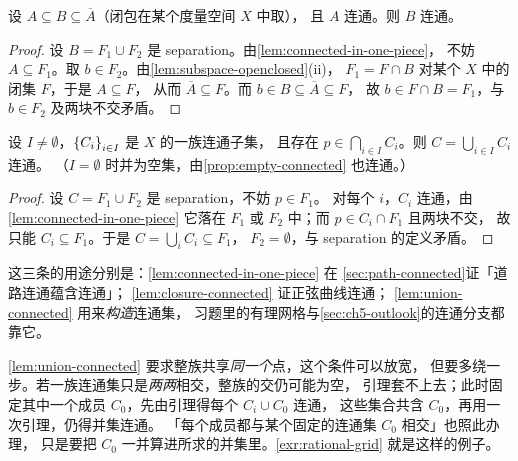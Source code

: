 \begin{lemma}[闭包连通]
  \label{lem:closure-connected}
  设 \(A \subseteq B \subseteq \overline{A}\)（闭包在某个度量空间 \(X\) 中取），
  且 \(A\) 连通。则 \(B\) 连通。
\end{lemma}

\begin{proof}
  设 \(B = F_{1} \cup F_{2}\) 是 separation。由\cref{lem:connected-in-one-piece}，
  不妨 \(A \subseteq F_{1}\)。取 \(b \in F_{2}\)。由\cref{lem:subspace-openclosed}(ii)，
  \(F_{1} = F \cap B\) 对某个 \(X\) 中的闭集 \(F\)，于是 \(A \subseteq F\)，
  从而 \(\overline{A} \subseteq F\)。而 \(b \in B \subseteq \overline{A} \subseteq F\)，
  故 \(b \in F \cap B = F_{1}\)，与 \(b \in F_{2}\) 及两块不交矛盾。
\end{proof}

\begin{lemma}[有公共点之并连通]
  \label{lem:union-connected}
  设 \(I \neq \emptyset\)，\(\left\{C_{i}\right\}_{i \in I}\) 是 \(X\) 的一族连通子集，
  且存在 \(p \in \bigcap_{i \in I} C_{i}\)。则 \(C = \bigcup_{i \in I} C_{i}\) 连通。
  （\(I = \emptyset\) 时并为空集，由\cref{prop:empty-connected} 也连通。）
\end{lemma}

\begin{proof}
  设 \(C = F_{1} \cup F_{2}\) 是 separation，不妨 \(p \in F_{1}\)。
  对每个 \(i\)，\(C_{i}\) 连通，由\cref{lem:connected-in-one-piece}
  它落在 \(F_{1}\) 或 \(F_{2}\) 中；而 \(p \in C_{i} \cap F_{1}\) 且两块不交，
  故只能 \(C_{i} \subseteq F_{1}\)。于是 \(C = \bigcup_{i} C_{i} \subseteq F_{1}\)，
  \(F_{2} = \emptyset\)，与 separation 的定义矛盾。
\end{proof}

\begin{remark}
  这三条的用途分别是：\cref{lem:connected-in-one-piece} 在%
  \cref{sec:path-connected}证「道路连通蕴含连通」；
  \cref{lem:closure-connected} 证正弦曲线连通；
  \cref{lem:union-connected} 用来\emph{构造}连通集，
  习题里的有理网格与\cref{sec:ch5-outlook}的连通分支都靠它。

  \cref{lem:union-connected} 要求整族共享\emph{同一个}点，这个条件可以放宽，
  但要多绕一步。若一族连通集只是\emph{两两}相交，整族的交仍可能为空，
  引理套不上去；此时固定其中一个成员 \(C_{0}\)，先由引理得每个 \(C_{i} \cup C_{0}\) 连通，
  这些集合共含 \(C_{0}\)，再用一次引理，仍得并集连通。
  「每个成员都与某个固定的连通集 \(C_{0}\) 相交」也照此办理，
  只是要把 \(C_{0}\) 一并算进所求的并集里。\cref{exr:rational-grid} 就是这样的例子。
\end{remark}

